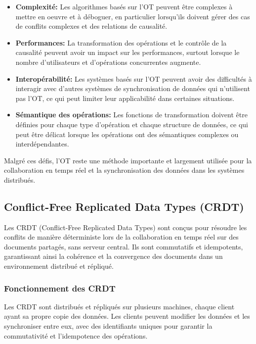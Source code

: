 \begin{itemize}
    \item \textbf{Complexité:} Les algorithmes basés sur l'OT peuvent être complexes à mettre en oeuvre et à déboguer, en particulier lorsqu'ils doivent gérer des cas de conflits complexes et des relations de causalité.
    \item \textbf{Performances:} La transformation des opérations et le contrôle de la causalité peuvent avoir un impact sur les performances, surtout lorsque le nombre d'utilisateurs et d'opérations concurrentes augmente.
    \item \textbf{Interopérabilité:} Les systèmes basés sur l'OT peuvent avoir des difficultés à interagir avec d'autres systèmes de synchronisation de données qui n'utilisent pas l'OT, ce qui peut limiter leur applicabilité dans certaines situations.
    \item \textbf{Sémantique des opérations:} Les fonctions de transformation doivent être définies pour chaque type d'opération et chaque structure de données, ce qui peut être délicat lorsque les opérations ont des sémantiques complexes ou interdépendantes.
\end{itemize}

Malgré ces défis, l'OT reste une méthode importante et largement utilisée pour la collaboration en temps réel et la synchronisation des données dans les systèmes distribués.

\subsection{Conflict-Free Replicated Data Types (CRDT)}

Les CRDT (Conflict-Free Replicated Data Types) sont conçus pour résoudre les conflits de manière déterministe lors de la collaboration en temps réel sur des documents partagés, sans serveur central. Ils sont commutatifs et idempotents, garantissant ainsi la cohérence et la convergence des documents dans un environnement distribué et répliqué.

\subsubsection{Fonctionnement des CRDT}

Les CRDT sont distribués et répliqués sur plusieurs machines, chaque client ayant sa propre copie des données. Les clients peuvent modifier les données et les synchroniser entre eux, avec des identifiants uniques pour garantir la commutativité et l'idempotence des opérations.


